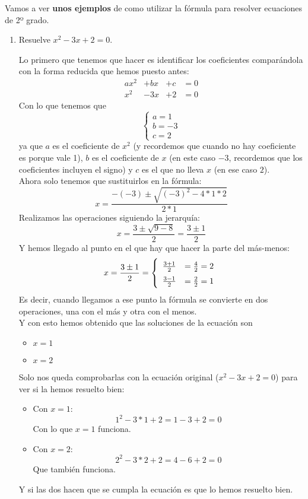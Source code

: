 \documentclass[a4paper,11pt,answers]{exam}
\begin{document}
  Vamos a ver \textbf{unos ejemplos} de como utilizar la fórmula para resolver ecuaciones de 2º grado.
  \begin{enumerate}
  \item Resuelve $x^2 - 3x +2 = 0$.
    \begin{solution}
      Lo primero que tenemos que hacer es identificar los coeficientes comparándola con la forma reducida que hemos puesto antes:
      \[\begin{array}{rrrc}
          ax^2&+bx&+c&=0\\x^2&-3x&+2&=0
        \end{array}\]
      Con lo que tenemos que
      \[\begin{cases}
          a=1\\b=-3\\c=2
        \end{cases}
      \]
      ya que $a$ es el coeficiente de $x^2$ (y recordemos que cuando no hay coeficiente es porque vale 1), $b$ es el coeficiente de $x$ (en este caso $-3$, recordemos que los coeficientes incluyen el signo) y $c$ es el que no lleva $x$ (en ese caso $2$).\\
      Ahora solo tenemos que sustituirlos en la fórmula:
      \[x = \frac{-(-3)\pm\sqrt{(-3)^2 - 4*1*2}}{2*1}\]
      Realizamos las operaciones siguiendo la jerarquía:
      \[x = \frac{3\pm\sqrt{9 - 8}}{2} = \frac{3\pm 1}{2}\]
      Y hemos llegado al punto en el que hay que hacer la parte del más-menos:
      \[\def\arraystretch{1.5}
	x = \frac{3\pm 1}{2} = \left\lbrace
          \begin{array}{ll}   
            \frac{3+ 1}{2} &=\frac{4}{2} = 2\\
            \frac{3- 1}{2} &=\frac{2}{2} = 1
          \end{array}
        \right.
      \]
      Es decir, cuando llegamos a ese punto la fórmula se convierte en dos operaciones, una con el más y otra con el menos.\\
      
      Y con esto hemos obtenido que las soluciones de la ecuación son
      \begin{itemize}
      \item $x=1$
      \item $x = 2$
      \end{itemize}
      Solo nos queda comprobarlas con la ecuación original ($x^2 - 3x + 2 = 0$) para ver si la hemos resuelto bien:
      \begin{itemize}
      \item Con $x=1$:\\
        \[1^2 - 3*1 + 2 = 1 - 3 + 2 = 0\]
        Con lo que $x=1$ funciona.
      \item Con $x=2$:
        \[2^2 - 3*2 + 2 = 4 - 6 + 2 = 0\]
        Que también funciona.
      \end{itemize}
      Y si las dos hacen que se cumpla la ecuación es que lo hemos resuelto bien.
      

\end{solution}
\end{enumerate}
\end{document}

